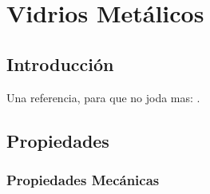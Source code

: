 
\chapter{Vidrios Met\'alicos} %

\label{Chapter1} %



\section{Introducci\'on}

\Large{Una referencia, para que no joda mas: } \citep{zberg09}.\\


\section{Propiedades}




\subsection{Propiedades Mec\'anicas}


